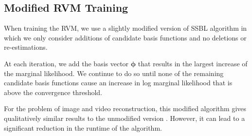 \subsection{Modified RVM Training}
When training the RVM, we use a slightly modified version of SSBL algorithm in which we only consider additions of candidate basis functions and no deletions or re-estimations.

At each iteration, we add the basis vector $\bm\phi$ that results in the largest increase of the marginal likelihood.
We continue to do so until none of the remaining candidate basis functions cause an increase in log marginal likelihood that is above the convergence threshold.

For the problem of image and video reconstruction, this modified algorithm gives qualitatively similar results to the unmodified version \cite{pilikos2014}. However, it can lead to a significant reduction in the runtime of the algorithm.

